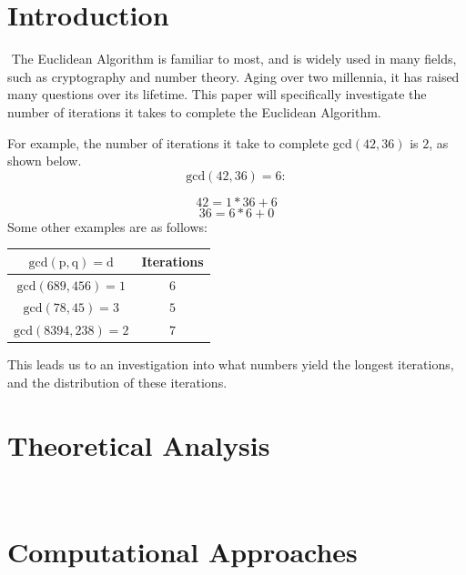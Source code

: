 \documentclass[11pt]{article}
\begin{document}
\tableofcontents
\newpage
\newpage

\section{Introduction}
$ $ \indent The Euclidean Algorithm is familiar to most, and is widely used in many fields, such as cryptography and number theory. Aging over two millennia, it has raised many questions over its lifetime. This paper will specifically investigate the number of iterations it takes to complete the Euclidean Algorithm. 

For example, the number of iterations it take to complete gcd$(42,36)$ is $2$, as shown below.
		$$\mathrm{gcd}(42,36) = 6:$$

	\begin{equation}
		42 = 1 * 36 + 6
	\end{equation}
	\begin{equation}
		36 = 6 * 6 + 0
	\end{equation}
Some other examples are as follows:

\begin{center}
\begin{tabular}{c|c}

$\mathrm{gcd}(\mathrm{p},\mathrm{q}) = \mathrm{d}$ & Iterations
\\
\hline
$\mathrm{gcd}(689,456) = 1$ & $6$\\

$\mathrm{gcd}(78,45) = 3$ & $5$\\

$\mathrm{gcd}(8394,238) = 2$ & $7$\\


\end{tabular}
\end{center}




This leads us to an investigation into what numbers yield the longest iterations, and the distribution of these iterations.


\section{Theoretical Analysis}$ $


\section{Computational Approaches}$ $
\end{document}
